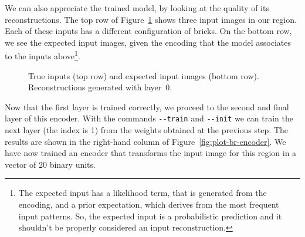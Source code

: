 We can also appreciate the trained model, by looking at the quality of its
reconstructions. The top row of Figure~\ref{fig:imgs-br-encoder-0} shows three
input images in our region. Each of these inputs has a different
configuration of bricks. On the bottom row, we see the expected input images,
given the encoding that the model associates to the inputs above\footnote{ The
expected input has a likelihood term, that is generated from the encoding, and
a prior expectation, which derives from the most frequent input patterns. So,
the expected input is a probabilistic prediction and it shouldn't be properly
considered an input reconstruction.  }.

\begin{figure}
	\centering
	\caption{True inputs (top row) and expected input images (bottom row).
	Reconstructions generated with layer~0.}
	\label{fig:imgs-br-encoder-0}
\end{figure}

Now that the first layer is trained correctly, we proceed to the second and
final layer of this encoder. With the commands \verb|--train| and
\verb|--init| we can train the next layer (the index is 1) from the weights
obtained at the previous step. The results are shown in the right-hand column
of Figure~\ref{fig:plot-br-encoder}. We have now trained an encoder that
transforms the input image for this region in a vector of 20 binary units.

